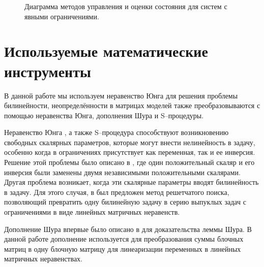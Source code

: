 \begin{figure}[ht]
	\caption{Диаграмма методов управления и оценки состояния для систем с явными ограничениями.}\label{fig:table}
\end{figure}

\section{Используемые математические инструменты}\label{sec:ch1/sec7}
В данной работе мы используем неравенство Юнга для решения проблемы билинейности, неопределённости в матрицах моделей также преобразовываются с помощью неравенства Юнга, дополнения Шура и S--процедуры.

Неравенство Юнга \cite{BOYED1994}, а также S--процедура \cite{Amato2011,LIEN2008} способствуют возникновению свободных скалярных параметров, которые могут внести нелинейность в задачу, особенно когда в ограничениях присутствует как переменная, так и ее инверсия. Решение этой проблемы было описано в \cite{KHELOUFI2016}, где один положительный скаляр и его инверсия были заменены двумя независимыми положительными скалярами. Другая проблема возникает, когда эти скалярные параметры вводят билинейность в задачу. Для этого случая, в \cite{KHELOUFI2013} был предложен метод решетчатого поиска, позволяющий превратить одну билинейную задачу в серию выпуклых задач с ограничениями в виде линейных матричных неравенств.

Дополнение Шура впервые было описано в \cite{Schur} для доказательства леммы Шура. В данной работе дополнение используется для преобразования суммы блочных матриц в одну блочную матрицу для линеаризации переменных в линейных матричных неравенствах.
\FloatBarrier
